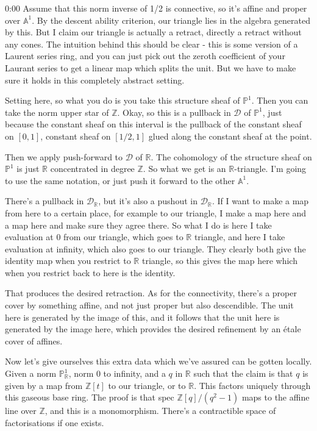 \begin{unfinished}{0:00}
Assume that this norm inverse of 1/2 is connective, so it's affine and proper over $\mathbb{A}^1$. By the descent ability criterion, our triangle lies in the algebra generated by this. But I claim our triangle is actually a retract, directly a retract without any cones. The intuition behind this should be clear - this is some version of a Laurent series ring, and you can just pick out the zeroth coefficient of your Laurant series to get a linear map which splits the unit. But we have to make sure it holds in this completely abstract setting.

Setting here, so what you do is you take this structure sheaf of $\mathbb{P}^1$. Then you can take the norm upper star of $\mathbb{Z}$. Okay, so this is a pullback in $\mathcal{D}$ of $\mathbb{P}^1$, just because the constant sheaf on this interval is the pullback of the constant sheaf on $[0,1]$, constant sheaf on $[1/2,1]$ glued along the constant sheaf at the point.

Then we apply push-forward to $\mathcal{D}$ of $\mathbb{R}$. The cohomology of the structure sheaf on $\mathbb{P}^1$ is just $\mathbb{R}$ concentrated in degree $\mathbb{Z}$. So what we get is an $\mathbb{R}$-triangle. I'm going to use the same notation, or just push it forward to the other $\mathbb{A}^1$.

There's a pullback in $\mathcal{D}_{\mathbb{R}}$, but it's also a pushout in $\mathcal{D}_{\mathbb{R}}$. If I want to make a map from here to a certain place, for example to our triangle, I make a map here and a map here and make sure they agree there. So what I do is here I take evaluation at 0 from our triangle, which goes to $\mathbb{R}$ triangle, and here I take evaluation at infinity, which also goes to our triangle. They clearly both give the identity map when you restrict to $\mathbb{R}$ triangle, so this gives the map here which when you restrict back to here is the identity.

That produces the desired retraction. As for the connectivity, there's a proper cover by something affine, and not just proper but also descendible. The unit here is generated by the image of this, and it follows that the unit here is generated by the image here, which provides the desired refinement by an étale cover of affines.

Now let's give ourselves this extra data which we've assured can be gotten locally. Given a norm $\mathbb{P}^1_{\mathbb{R}}$, norm 0 to infinity, and a $q$ in $\mathbb{R}$ such that the claim is that $q$ is given by a map from $\mathbb{Z}[t]$ to our triangle, or to $\mathbb{R}$. This factors uniquely through this gaseous base ring. The proof is that spec $\mathbb{Z}[q]/(q^2 - 1)$ maps to the affine line over $\mathbb{Z}$, and this is a monomorphism. There's a contractible space of factorisations if one exists.


\end{unfinished}
